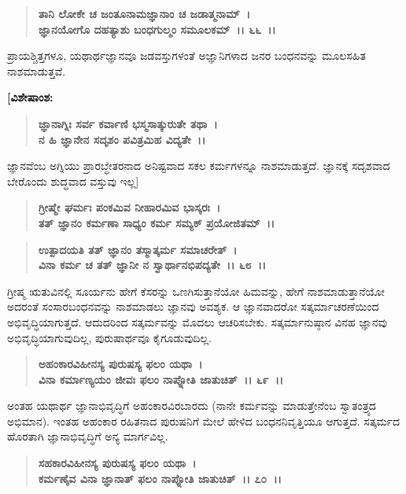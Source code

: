 \begin{verse}
\textbf{ತಾನಿ ಲೋಕೇ ಚ ಜಂತೂನಾಮಜ್ಞಾನಾಂ ಚ ಜಡಾತ್ಮನಾಮ್~।}\\\textbf{ಜ್ಞಾನಯೋಗೊ ದಹತ್ಯಾಶು ಬಂಧಗುಲ್ಮಂ ಸಮೂಲಕಮ್~।। ೬೬~।।}
\end{verse}

ಪ್ರಾಯಶ್ಚಿತ್ತಗಳೂ, ಯಥಾರ್ಥಜ್ಞಾನವೂ ಜಡವಸ್ತುಗಳಂತೆ ಅಜ್ಞಾನಿಗಳಾದ ಜನರ ಬಂಧನವನ್ನು ಮೂಲಸಹಿತ ನಾಶಮಾಡುತ್ತವೆ.

\textbf{[ವಿಶೇಷಾಂಶ:}

\begin{verse}
\textbf{ಜ್ಞಾನಾಗ್ನಿಃ ಸರ್ವ ಕರ್ವಾಣಿ ಭಸ್ಮಸಾತ್ಕುರುತೇ ತಥಾ~।}\\\textbf{ನ ಹಿ ಜ್ಞಾನೇನ ಸದೃಶಂ ಪವಿತ್ರಮಿಹ ವಿದ್ಯತೇ~।।} 
\end{verse}

ಜ್ಞಾನವೆಂಬ ಅಗ್ನಿಯು ಪ್ರಾರಬ್ಧೇತರನಾದ ಅನಿಷ್ಟವಾದ ಸಕಲ ಕರ್ಮಗಳನ್ನೂ ನಾಶಮಾಡುತ್ತದೆ. ಜ್ಞಾನಕ್ಕೆ ಸದೃಶವಾದ ಬೇರೊಂದು ಶುದ್ಧವಾದ ವಸ್ತುವು ಇಲ್ಲ]

\begin{verse}
\textbf{ಗ್ರೀಷ್ಮೇ ಘರ್ಮಃ ಪಂಕಮಿವ ನೀಹಾರಮಿವ ಭಾಸ್ಕರಃ~।}\\\textbf{ತತ್ ಜ್ಞಾನಂ ಕರ್ಮಣಾ ಸಾಧ್ಯಂ ಕರ್ಮ ಸಮ್ಯಕ್ ಪ್ರಯೋಜಿತಮ್~।। }
\end{verse}

\begin{verse}
\textbf{ಉತ್ಪಾದಯತಿ ತತ್ ಜ್ಞಾನಂ ತಸ್ಮಾತ್ಕರ್ಮ ಸಮಾಚರೇತ್~।}\\\textbf{ವಿನಾ ಕರ್ಮ ಚ ತತ್ ಜ್ಞಾನೀ ನ ಸ್ವಾರ್ಥಾನಭಿಪದ್ಯತೇ~।। ೬೮~।।}
\end{verse}

ಗ್ರೀಷ್ಮ ಋತುವಿನಲ್ಲಿ ಸೂರ್ಯನು ಹೇಗೆ ಕೆಸರನ್ನು ಒಣಗಿಸುತ್ತಾನೆಯೋ ಹಿಮವನ್ನು, ಹೇಗೆ ನಾಶಮಾಡುತ್ತಾನೆಯೋ ಅದರಂತೆ ಸಂಸಾರಬಂಧನವನ್ನು ನಾಶಮಾಡಲು ಜ್ಞಾನವು ಅವಶ್ಯಕ. ಆ ಜ್ಞಾನವಾದರೋ ಸತ್ಕರ್ಮಾಚರಣೆಯಿಂದ ಅಭಿವೃದ್ಧಿಯಾಗುತ್ತದೆ. ಆದುದರಿಂದ ಸತ್ಕರ್ಮವನ್ನು ಮೊದಲು ಆಚರಿಸಬೇಕು. ಸತ್ಕರ್ಮಾನುಷ್ಠಾನ ವಿನಹ ಜ್ಞಾನವು ಅಭಿವೃದ್ಧಿಯಾಗುವುದಿಲ್ಲ, ಪುರುಷಾರ್ಥವೂ ಕೈಗೂಡುವುದಿಲ್ಲ.

\begin{verse}
\textbf{ಅಹಂಕಾರವಿಹೀನಸ್ಯ ಪುರುಷಸ್ಯ ಫಲಂ ಯಥಾ~।}\\\textbf{ವಿನಾ ಕರ್ಮಾಣ್ಯಯಂ ಜೀವಃ ಫಲಂ ನಾಪ್ನೋತಿ ಜಾತುಚಿತ್~।। ೬೯~।।}
\end{verse}

ಅಂತಹ ಯಥಾರ್ಥ ಜ್ಞಾನಾಭಿವೃದ್ಧಿಗೆ ಅಹಂಕಾರವಿರಬಾರದು (ನಾನೇ ಕರ್ಮವನ್ನು ಮಾಡುತ್ತೇನೆಂಬ ಸ್ವಾತಂತ್ರ್ಯದ ಅಭಿಮಾನ). ಇಂತಹ ಅಹಂಕಾರ ರಹಿತನಾದ ಪುರುಷನಿಗೆ ಮೇಲೆ ಹೇಳಿದ ಬಂಧನನಿವೃತ್ತಿಯೂ ಆಗುತ್ತದೆ. ಸತ್ಕರ್ಮದ ಹೊರತಾಗಿ ಜ್ಞಾನಾಭಿವೃದ್ಧಿಗೆ ಅನ್ಯ ಮಾರ್ಗವಿಲ್ಲ.

\begin{verse}
\textbf{ಸಹಕಾರವಿಹೀನಸ್ಯ ಪುರುಷಸ್ಯ ಫಲಂ ಯಥಾ~।}\\\textbf{ಕರ್ಮಣೈವ ವಿನಾ ಜ್ಞಾನಾತ್ ಫಲಂ ನಾಪ್ನೋತಿ ಜಾತುಚಿತ್~।। ೭೦~।।}
\end{verse}

